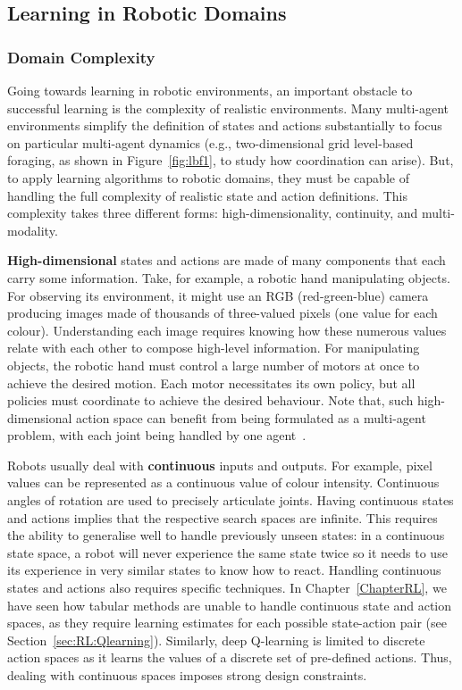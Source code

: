 \subsection{Learning in Robotic Domains}

\subsubsection{Domain Complexity}\label{sec:MAL:DomainComplexity}

Going towards learning in robotic environments, an important obstacle to successful learning is the complexity of realistic environments. Many multi-agent environments simplify the definition of states and actions substantially to focus on particular multi-agent dynamics (e.g., two-dimensional grid level-based foraging, as shown in Figure~\ref{fig:lbf1}, to study how coordination can arise). But, to apply learning algorithms to robotic domains, they must be capable of handling the full complexity of realistic state and action definitions. This complexity takes three different forms: high-dimensionality, continuity, and multi-modality. 

\textbf{High-dimensional} states and actions are made of many components that each carry some information. Take, for example, a robotic hand manipulating objects. For observing its environment, it might use an RGB (red-green-blue) camera producing images made of thousands of three-valued pixels (one value for each colour). Understanding each image requires knowing how these numerous values relate with each other to compose high-level information. For manipulating objects, the robotic hand must control a large number of motors at once to achieve the desired motion. Each motor necessitates its own policy, but all policies must coordinate to achieve the desired behaviour. Note that, such high-dimensional action space can benefit from being formulated as a multi-agent problem, with each joint being handled by one agent~\citep{Sartoretti2019_DistribArticulat}. 

Robots usually deal with \textbf{continuous} inputs and outputs. For example, pixel values can be represented as a continuous value of colour intensity. Continuous angles of rotation are used to precisely articulate joints. Having continuous states and actions implies that the respective search spaces are infinite. This requires the ability to generalise well to handle previously unseen states: in a continuous state space, a robot will never experience the same state twice so it needs to use its experience in very similar states to know how to react. Handling continuous states and actions also requires specific techniques. In Chapter~\ref{ChapterRL}, we have seen how tabular methods are unable to handle continuous state and action spaces, as they require learning estimates for each possible state-action pair (see Section~\ref{sec:RL:Qlearning}). Similarly, deep Q-learning is limited to discrete action spaces as it learns the values of a discrete set of pre-defined actions. Thus, dealing with continuous spaces imposes strong design constraints. 

